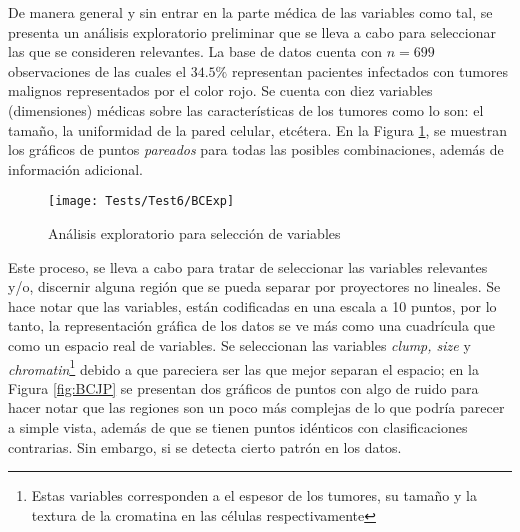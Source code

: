 \documentclass[../Main/Main.tex]{subfiles}
\begin{document}
De manera general y sin entrar en la parte médica de las variables como tal, se presenta un análisis exploratorio preliminar que se lleva a cabo para seleccionar las que se consideren relevantes. La base de datos cuenta con $n = 699$ observaciones de las cuales el $34.5\%$ representan pacientes infectados con tumores malignos representados por el color rojo. Se cuenta con diez variables (dimensiones) médicas sobre las características de los tumores como lo son: el tamaño, la uniformidad de la pared celular, etcétera. En la Figura \ref{fig:BCExp}, se muestran los gráficos de puntos \textit{pareados} para todas las posibles combinaciones, además de información adicional.
\begin{figure}[h]
	\centering
	\texttt{[image: Tests/Test6/BCExp]}
	\caption{Análisis exploratorio para selección de variables}
	\label{fig:BCExp}
\end{figure}
Este proceso, se lleva a cabo para tratar de seleccionar las variables relevantes y/o, discernir alguna región que se pueda separar por proyectores no lineales. Se hace notar que las variables, están codificadas en una escala a 10 puntos, por lo tanto, la representación gráfica de los datos se ve más como una cuadrícula que como un espacio real de variables. Se seleccionan las variables \textit{clump, size} y \textit{chromatin}\footnote{Estas variables corresponden a el espesor de los tumores, su tamaño y la textura de la cromatina en las células respectivamente} debido a que pareciera ser las que mejor separan el espacio; en la Figura \ref{fig:BCJP} se presentan dos gráficos de puntos con algo de ruido para hacer notar que las regiones son un poco más complejas de lo que podría parecer a simple vista, además de que se tienen puntos idénticos con clasificaciones contrarias. Sin embargo, si se detecta cierto patrón en los datos.
\end{document}
